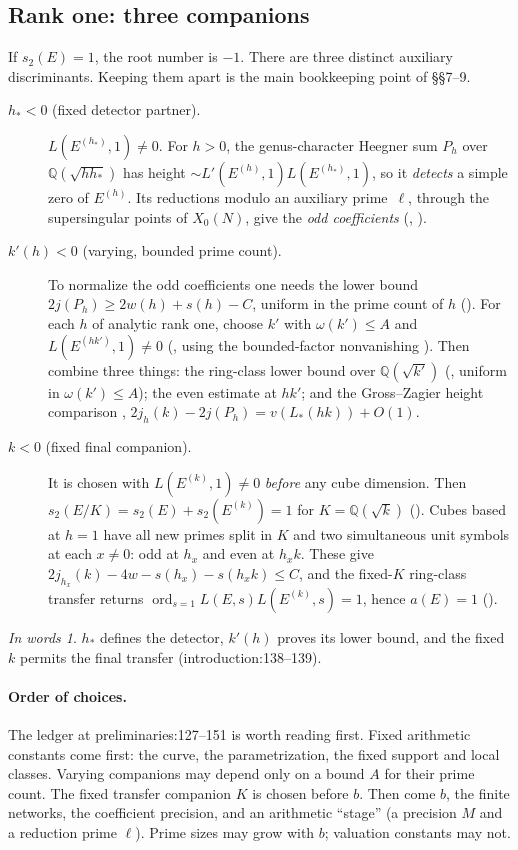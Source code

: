 \documentclass[11pt]{article}
\theoremstyle{remark}
\newtheorem*{inwords}{In words}
\newcommand{\Q}{\mathbb Q}
\DeclareMathOperator{\ord}{ord}
\newcommand{\src}[2]{\textsf{\small #1:#2}}
\begin{document}
\subsection{Rank one: three companions}
If $s_2(E)=1$, the root number is $-1$. There are three distinct auxiliary
discriminants. Keeping them apart is the main bookkeeping point of
\S\S7--9.
\begin{description}
\item[$h_*<0$ (fixed detector partner).] $L(E^{(h_*)},1)\ne0$. For $h>0$,
 the genus-character Heegner sum $P_h$ over $\Q(\sqrt{hh_*})$ has height
 $\sim L'(E^{(h)},1)L(E^{(h_*)},1)$, so it \emph{detects} a simple zero of
 $E^{(h)}$. Its reductions modulo an auxiliary prime~$\ell$, through the supersingular
 points of $X_0(N)$, give the
 \emph{odd coefficients} (, ).
\item[$k'(h)<0$ (varying, bounded prime count).] To normalize the odd
 coefficients one needs the lower bound $2j(P_h)\ge2w(h)+s(h)-C$,
 uniform in the prime count of $h$ (). For each $h$ of
 analytic rank one, choose $k'$ with $\omega(k')\le A$ and
 $L(E^{(hk')},1)\ne0$ (, using the bounded-factor
 nonvanishing ). Then combine three things: the ring-class
 lower bound over $\Q(\sqrt{k'})$ (, uniform in
 $\omega(k')\le A$); the even estimate at $hk'$; and the Gross--Zagier
 height comparison ,
 $2j_h(k)-2j(P_h)=v(L_*(hk))+O(1)$.
\item[$k<0$ (fixed final companion).] It is chosen with
 $L(E^{(k)},1)\ne0$ \emph{before} any cube dimension. Then
 $s_2(E/K)=s_2(E)+s_2(E^{(k)})=1$ for $K=\Q(\sqrt k)$
 (). Cubes based at $h=1$ have all new primes
 split in $K$ and two simultaneous unit symbols at each $x\ne0$: odd at
 $h_x$ and even at $h_xk$. These give $2j_{h_x}(k)-4w-s(h_x)-s(h_xk)\le C$,
 and the fixed-$K$ ring-class transfer  returns
 $\ord_{s=1}L(E,s)L(E^{(k)},s)=1$, hence $a(E)=1$ ().
\end{description}

\begin{inwords}
$h_*$ defines the detector, $k'(h)$ proves its lower bound, and the fixed $k$
permits the final transfer (\src{introduction}{138--139}).
\end{inwords}

\paragraph{Order of choices.}
The ledger at \src{preliminaries}{127--151} is worth reading first. Fixed
arithmetic constants come first: the curve, the parametrization, the fixed
support and local classes. Varying companions may depend only on a bound $A$
for their prime count. The fixed transfer companion $K$ is chosen before $b$.
Then come $b$, the finite networks, the coefficient precision, and an
arithmetic ``stage'' (a precision $M$ and a reduction prime $\ell$). Prime
sizes may grow with $b$; valuation constants may not.
\end{document}
